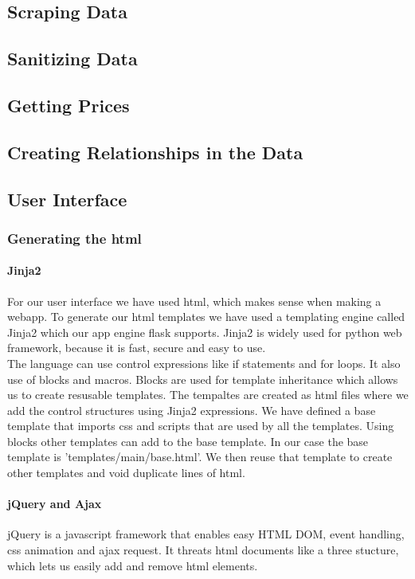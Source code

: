 \documentclass{article}
\begin{document}
\subsection{Scraping Data}

\subsection{Sanitizing Data}

\subsection{Getting Prices}

\subsection{Creating Relationships in the Data}

\subsection{User Interface}
\subsubsection{Generating the html}
\paragraph{Jinja2}
For our user interface we have used html, which makes sense when making a
webapp. To generate our html templates we have used a templating engine called
Jinja2 which our app engine flask supports. Jinja2 is widely used for python
web framework, because it is fast, secure and easy to use.\\

The language can use control expressions like if statements and for loops. It
also use of blocks and macros. Blocks are used for template inheritance which
allows us to create resusable templates. The tempaltes are created as html files
where we add the control structures using Jinja2 expressions. We have defined
a base template that imports css and scripts that are used by all the templates.
Using blocks other templates can add to the base template. In our case the base
template is 'templates/main/base.html'. We then reuse that template to create
other templates and void duplicate lines of html.

\paragraph{jQuery and Ajax}
jQuery is a javascript framework that enables easy HTML DOM, event handling,
css animation and ajax request. It threats html documents like a three stucture,
which lets us easily add and remove html elements.\\
\end{document}
